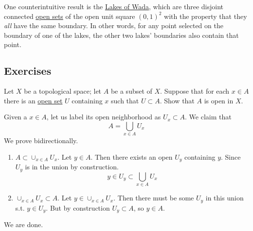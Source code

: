  One counterintuitive result is the \href{https://en.wikipedia.org/wiki/Lakes_of_Wada}{Lakes of Wada}, which are three disjoint connected \hyperref[def:open-set]{open sets} of the open unit square $(0, 1)^2$ with the property that they \textit{all} have the same boundary. In other words, for any point selected on the boundary of one of the lakes, the other two lakes' boundaries also contain that point. 

\subsection{Exercises}

  \begin{exercise}[Munkres 13.1]
    Let $X$ be a topological space; let $A$ be a subset of $X$. Suppose that for each $x \in A$ there is an \hyperref[def:open-set]{open set} $U$ containing $x$ such that $U \subset A$. Show that $A$ is open in $X$.
  \end{exercise}
  \begin{solution}[Munkres 13.1]
    Given a $x \in A$, let us label its open neighborhood as $U_x \subset A$. We claim that 
    \begin{equation}
      A = \bigcup_{x \in A} U_x
    \end{equation} 
    We prove bidirectionally. 
    \begin{enumerate}
      \item $A \subset \cup_{x \in A} U_x$. Let $y \in A$. Then there exists an open $U_y$ containing $y$. Since $U_y$ is in the union by construction. 
      \begin{equation}
        y \in U_y \subset \bigcup_{x \in A} U_x
      \end{equation}
      \item $\cup_{x \in A} U_x \subset A$. Let $y \in \cup_{x \in A} U_x$. Then there must be some $U_y$ in this union s.t. $y \in U_y$. But by construction $U_y \subset A$, so $y \in A$. 
    \end{enumerate}
    We are done. 
  \end{solution}

